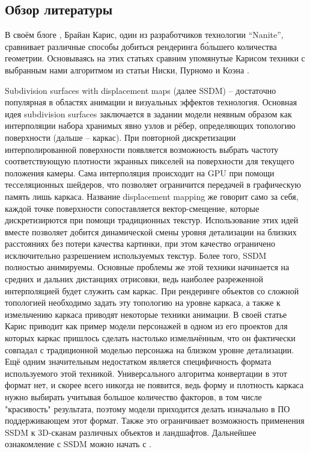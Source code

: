 \documentclass[12pt]{extarticle}
\begin{document}
\subsection{Обзор литературы}
\label{sec:related}
В своём блоге \cite{graphicrants_moregeometry}, \cite{graphicrants_vgi} Брайан Карис, один из разработчиков технологии ``Nanite'', сравнивает различные способы добиться рендеринга б\'ольшего количества геометрии. Основываясь на этих статьях сравним упомянутые Карисом техники с выбранным нами алгоритмом из статьи Ниски, Пурномо и Коэна \cite{niski2007multi}.

Subdivision surfaces with displacement maps (далее SSDM) -- достаточно популярная в областях анимации и визуальных эффектов технология. Основная идея subdivision surfaces заключается в задании модели неявным образом как интерполяции набора хранимых явно узлов и рёбер, определяющих топологию поверхности (дальше -- каркас). При повторной дискретизации интерполированной поверхности появляется возможность выбрать частоту соответствующую плотности экранных пикселей на поверхности для текущего положения камеры. Сама интерполяция происходит на GPU при помощи тесселяционных шейдеров, что позволяет ограничится передачей в графическую память лишь каркаса. Название displacement mapping же говорит само за себя, каждой точке поверхности сопоставляется вектор-смещение, которые дискретизирются при помощи традиционных текстур. Использование этих идей вместе позволяет добится динамической смены уровня детализации на близких расстояниях без потери качества картинки, при этом качество ограничено исключительно разрешением используемых текстур. Более того, SSDM полностью анимируемы. Основные проблемы же этой техники начинается на средних и дальних дистанциях отрисовки, ведь наиболее разреженной интерполяцией будет служить сам каркас. При рендеринге объектов со сложной топологией необходимо задать эту топологию на уровне каркаса, а также к измельчению каркаса приводят некоторые техники анимации. В своей статье Карис приводит как пример модели персонажей в одном из его проектов для которых каркас пришлось сделать настолько измельчённым, что он фактически совпадал с традиционной моделью персонажа на близком уровне детализации. Ещё одним значительным недостатком является специфичность формата используемого этой техникой. Универсального алгоритма конвертации в этот формат нет, и скорее всего никогда не появится, ведь форму и плотность каркаса нужно выбирать учитывая большое количество факторов, в том числе "красивость" результата, поэтому модели приходится делать изначально в ПО поддерживающем этот формат. Также это ограничивает возможность применения SSDM к 3D-сканам различных объектов и ландшафтов. Дальнейшее ознакомление с SSDM можно начать с \cite{ref}.
\end{document}
